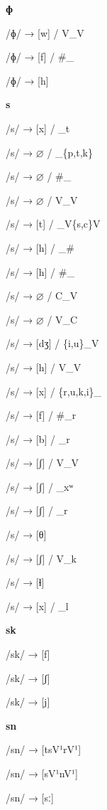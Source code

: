 \begin{center}\textbf{ɸ}\end{center}
\begin{multicols}{4}
\noindent /ɸ/ → [w] / V\_V

\noindent /ɸ/ → [f] / \#\_

\noindent /ɸ/ → [h]
\end{multicols}

\begin{center}\textbf{s}\end{center}
\begin{multicols}{4}
\noindent /s/ → [x] / \_t

\noindent /s/ → $\varnothing$ / \_\{p,t,k\}

\noindent /s/ → $\varnothing$ / \#\_

\noindent /s/ → $\varnothing$ / V\_V

\noindent /s/ → [t] / \_V\{s,c\}V

\noindent /s/ → [h] / \_\#

\noindent /s/ → [h] / \#\_

\noindent /s/ → $\varnothing$ / C\_V

\noindent /s/ → $\varnothing$ / V\_C

\noindent /s/ → [dʒ] / \{i,u\}\_V

\noindent /s/ → [h] / V\_V

\noindent /s/ → [x] / \{r,u,k,i\}\_

\noindent /s/ → [f] / \#\_r

\noindent /s/ → [b] / \_r

\noindent /s/ → [ʃ] / V\_V

\noindent /s/ → [ʃ] / \_xʷ

\noindent /s/ → [ʃ] / \_r

\noindent /s/ → [θ]

\noindent /s/ → [ʃ] / V\_k

\noindent /s/ → [ɬ]

\noindent /s/ → [x] / \_l
\end{multicols}


\begin{center}\textbf{sk}\end{center}
\begin{multicols}{4}
\noindent /sk/ → [f]

\noindent /sk/ → [ʃ]

\noindent /sk/ → [j]
\end{multicols}


\begin{center}\textbf{sn}\end{center}
\begin{multicols}{4}
\noindent /sn/ → [tsV¹rV¹]

\noindent /sn/ → [sV¹nV¹]

\noindent /sn/ → [sː]
\end{multicols}


